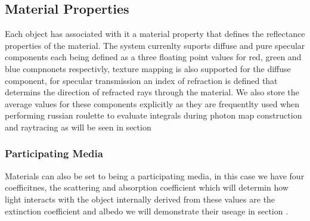 \subsection{Material Properties}
Each object has associated with it a material property that defines the reflectance properties of the material.
The system currenlty suports diffuse and pure specular components each being defined as a three floating point
values for red, green and blue compnonets respectivly, texture mapping is also supported for the diffuse component,
for specular transmission an index of refraction is defined that determins the direction of refracted rays through the
material. We also store the average values for these components explicitly as they are frequentlty used when performing
russian roulette to evaluate integrals during photon map construction and raytracing as will be seen in section 

\subsubsection{Participating Media}
Materials can also be set to being a participating media, in this case we have four coefficitnes, the scattering and
absorption coefficient which will determin how light interacts with the object internally derived from these values
are the extinction coefficient and albedo we will demonstrate their useage in section .


